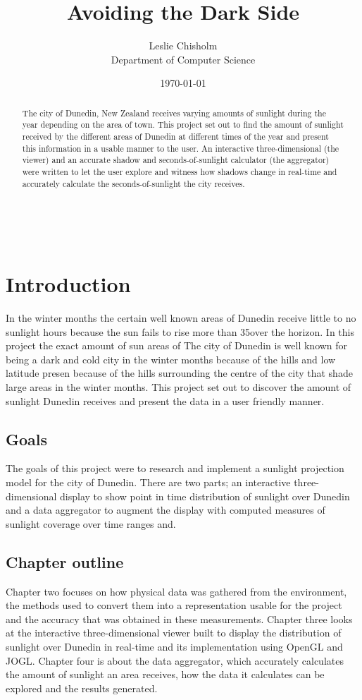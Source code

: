 \documentclass[12pt]{report}
\title{Avoiding the Dark Side}
\author{
        Leslie Chisholm \\
                Department of Computer Science\\
}
\date{\today}
\begin{document}
\maketitle

\begin{abstract}
The city of Dunedin, New Zealand receives varying amounts of sunlight during the year depending on the area of town. This project set out to find the amount of sunlight received by the different areas of Dunedin at different times of the year and present this information in a usable manner to the user. An interactive three-dimensional (the viewer) and an accurate shadow and seconds-of-sunlight calculator (the aggregator) were written to let the user explore and witness how shadows change in real-time and accurately calculate the seconds-of-sunlight the city receives.
\end{abstract}

\tableofcontents
\listoffigures\
\listofalgorithms
\chapter{Introduction}
In the winter months the certain well known areas of Dunedin receive little to no sunlight hours because the sun fails to rise more than 35\degree over the horizon. In this project the exact amount of sun areas of 
The city of Dunedin is well known for being a dark and cold city in the winter months because of the hills and low latitude presen
 because of the hills surrounding the centre of the city that shade large areas in the winter months. This project set out to discover the amount of sunlight Dunedin receives and present the data in a user friendly manner.\\

\section{Goals}
The goals of this project were to research and implement a sunlight projection model for the city of Dunedin. There are two parts; an interactive three-dimensional display to show point in time distribution of sunlight over Dunedin and a data aggregator to augment the display with computed measures of sunlight coverage over time ranges and.\\

\section{Chapter outline}
Chapter two focuses on how physical data was gathered from the environment, the methods used to convert them into a representation usable for the project and the accuracy that was obtained in these measurements. Chapter three looks at the interactive three-dimensional viewer built to display the distribution of sunlight over Dunedin in real-time and its implementation using OpenGL and JOGL. Chapter four is about the data aggregator, which accurately calculates the amount of sunlight an area receives, how the data it calculates can be explored and the results generated.\\
\end{document}

